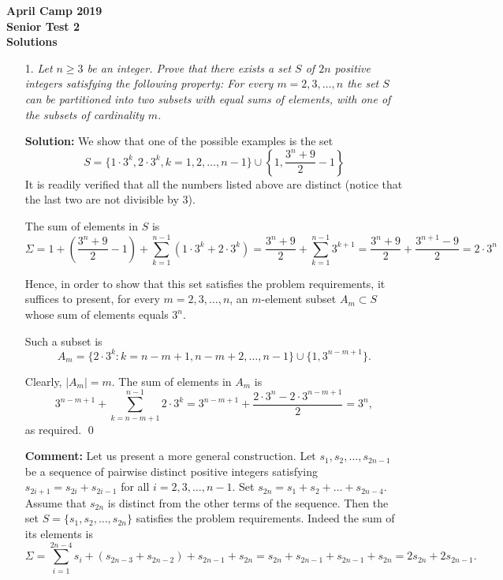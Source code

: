 \documentclass[a4paper, 12pt]{article}
\begin{document}
\begin{center}
\textbf{April Camp 2019 \\ Senior Test 2} \\
\textbf{Solutions}
\end{center}
\vspace{5mm}

\begin{enumerate}

\item[1.]  \textit{Let $n \geq 3$ be an integer. Prove that there exists a set $S$ of $2n$ positive integers satisfying the following property: For every $m = 2, 3, \dots, n$ the set $S$ can be partitioned into two subsets with equal sums of elements, with one of the subsets of cardinality $m$.
}
\vspace{5mm}


\textbf{Solution:}  We show that one of the possible examples is the set
$$
S = \{ 1 \cdot 3^k, 2 \cdot 3^k, k = 1, 2, \dots, n-1 \} \cup \left\{  1, \frac{3^n + 9}{2} - 1  \right\}
$$
It is readily verified that all the numbers listed above are distinct (notice that the last two are not divisible by 3).

The sum of elements in $S$ is
$$
\Sigma = 1 +  \left( \frac{3^n + 9}{2} - 1 \right)  + \sum_{k=1}^{n-1} (1 \cdot 3^k + 2 \cdot 3^k ) = \frac{3^n + 9}{2} + \sum_{k=1}^{n-1} 3^{k+1} = \frac{3^n + 9}{2} + \frac{3^{n+1} - 9}{2} = 2 \cdot 3^n
$$

Hence, in order to show that this set satisfies the problem requirements, it suffices to present, for every $m = 2, 3, \dots, n$, an $m$-element subset $A_m \subset S$ whose sum of elements equals $3^n$.

Such a subset is
$$
A_m = \{2 \cdot 3^k : k = n-m+1, n-m+2, \dots, n-1 \} \cup \{1, 3^{n-m+1} \}.
$$

Clearly, $|A_m| = m$. The sum of elements in $A_m$ is
$$
3^{n-m+1} + \sum_{k=n-m+1}^{n-1} 2 \cdot 3^k = 3^{n-m+1} + \frac{2 \cdot 3^n - 2 \cdot 3^{n-m+1}}{2} = 3^n,
$$
as required.  \qed

\vspace{5mm}
\textbf{Comment: }  Let us present a more general construction. Let $s_1, s_2, \dots, s_{2n-1}$ be a sequence of pairwise distinct positive integers satisfying $s_{2i+1} = s_{2i} + s_{2i-1}$ for all $i = 2, 3, \dots, n-1$. Set $s_{2n} = s_1 + s_2 + \dots + s_{2n-4}$. \\

Assume that $s_{2n}$ is distinct from the other terms of the sequence. Then the set $S = \{s_1, s_2, \dots, s_{2n} \}$ satisfies the problem requirements. Indeed the sum of its elements is
$$
\Sigma = \sum_{i=1}^{2n-4} s_i + (s_{2n-3} + s_{2n-2}) + s_{2n-1} + s_{2n} = s_{2n} + s_{2n-1} + s_{2n-1} + s_{2n} = 2s_{2n} + 2s_{2n-1}.
$$


\end{enumerate}
\end{document}
